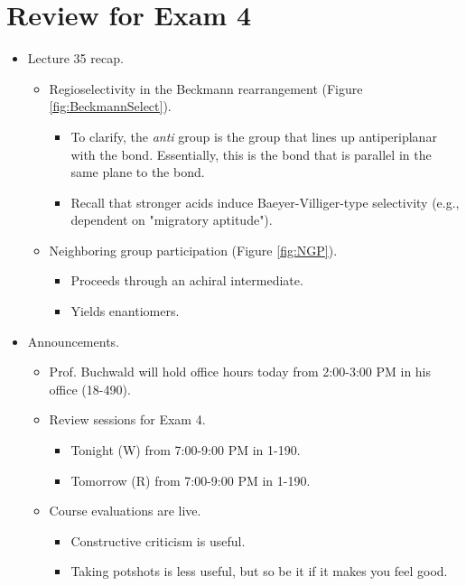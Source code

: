 \documentclass[../notes.tex]{subfiles}
\begin{document}
\section{Review for Exam 4}
\begin{itemize}
    \item {}Lecture 35 recap.
    \begin{itemize}
        \item Regioselectivity in the Beckmann rearrangement (Figure \ref{fig:BeckmannSelect}).
        \begin{itemize}
            \item To clarify, the \emph{anti} group is the group that lines up antiperiplanar with the  bond. Essentially, this is the  bond that is parallel in the same plane to the  bond.
            \item Recall that stronger acids induce Baeyer-Villiger-type selectivity (e.g., dependent on "migratory aptitude").
        \end{itemize}
        \item Neighboring group participation (Figure \ref{fig:NGP}).
        \begin{itemize}
            \item Proceeds through an achiral intermediate.
            \item Yields enantiomers.
        \end{itemize}
    \end{itemize}
    \item Announcements.
    \begin{itemize}
        \item Prof. Buchwald will hold office hours today from 2:00-3:00 PM in his office (18-490).
        \item Review sessions for Exam 4.
        \begin{itemize}
            \item Tonight (W) from 7:00-9:00 PM in 1-190.
            \item Tomorrow (R) from 7:00-9:00 PM in 1-190.
        \end{itemize}
        \item Course evaluations are live.
        \begin{itemize}
            \item Constructive criticism is useful.
            \item Taking potshots is less useful, but so be it if it makes you feel good.
        \end{itemize}

\end{itemize}
\end{itemize}
\end{document}
